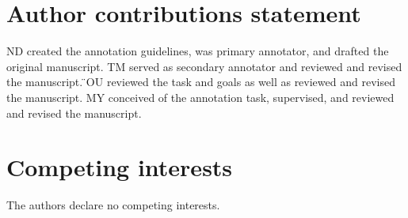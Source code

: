 \documentclass[fleqn,10pt]{wlscirep}
\begin{document}
\section*{Author contributions statement}

ND created the annotation guidelines, was primary annotator, and drafted the original manuscript. TM served as secondary annotator and reviewed and revised the manuscript. ̈OU reviewed the task and goals as well as reviewed and revised the manuscript. MY conceived of the annotation task, supervised, and reviewed and revised the manuscript.

\section*{Competing interests}

The authors declare no competing interests.


\end{document}
